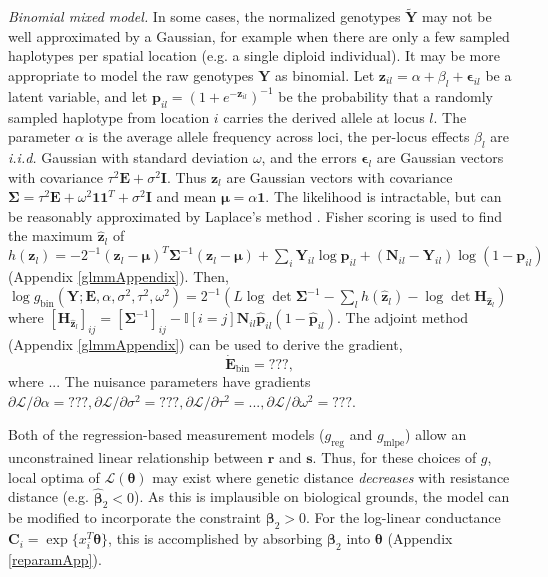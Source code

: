 \documentclass[11pt]{article}
\newcommand{\mat}[1]{\mathbf{#1}}
\begin{document}
\emph{Binomial mixed model.} In some cases, the normalized genotypes
$\tilde{\mat Y}$ may not be well approximated by a Gaussian, for example when
there are only a few sampled haplotypes per spatial location (e.g. a single
diploid individual). It may be more appropriate to model the raw genotypes
$\mat Y$ as binomial. Let $\mat z_{il} = \alpha + \beta_l + \bm \epsilon_{il}$ be a latent variable, and let $\mat p_{il} = (1 + e^{-\mat z_{il}})^{-1}$ 
be the probability that a randomly sampled haplotype from location $i$ carries the derived allele at locus $l$. The parameter
$\alpha$ is the average allele frequency across loci, the per-locus effects $\beta_l$ are \emph{i.i.d.} Gaussian with standard deviation $\omega$,
and the errors $\bm \epsilon_l$ are Gaussian vectors with covariance $\tau^2 \mat E + \sigma^2 \mat I$. 
Thus $\mat z_l$ are Gaussian vectors with covariance 
$\mat \Sigma = \tau^2 \mat E + \omega^2 \mat 1 \mat 1^T + \sigma^2 \mat I$ and mean $\bm \mu = \alpha \mat 1$.
The likelihood is intractable, but can be reasonably approximated by Laplace's
method \cite{laplaceApprox}. Fisher scoring is used to find the maximum $\hat{\mat z}_l$ of $h(\mat z_l) = -2^{-1} (\mat z_l - \bm \mu)^T
\mat \Sigma^{-1} (\mat z_l - \bm \mu) + \sum_i \mat Y_{il} \log \mat p_{il} + (\mat N_{il}
- \mat Y_{il}) \log (1 - \mat p_{il}) $ (Appendix
\ref{glmmAppendix}).
Then, 
$\log g_{\mathrm{bin}}(\mat Y; \mat E, \alpha, \sigma^2, \tau^2, \omega^2) = 2^{-1} (L \log \det \mat \Sigma^{-1} - \sum_l h(\hat{\mat z}_l) - \log \det \mat H_{\hat{\mat z}_l})$ where
$[\mat H_{\hat{\mat z}_l}]_{ij} = [\mat \Sigma^{-1}]_{ij} - \mathbb{I}[i = j] \mat N_{il} \hat{\mat p}_{il} (1 - \hat{\mat p}_{il})$.
The adjoint method (Appendix \ref{glmmAppendix}) can be used to derive the gradient, 
\[
  \dot{\mat E}_{\mathrm{bin}} = ???,
\]
where ...
The nuisance parameters have gradients $\partial \mathcal{L}/\partial \alpha = ???, \partial \mathcal{L}/\partial \sigma^2 = ???, \partial \mathcal{L}/\partial \tau^2 = ..., \partial \mathcal{L}/\partial \omega^2 = ???$.

Both of the regression-based measurement models ($g_{\mathrm{reg}}$ and
$g_{\mathrm{mlpe}}$) allow an unconstrained linear relationship between $\mat r$ and
$\mat s$. Thus, for these choices of $g$, local optima of $\mathcal{L}(\bm
\theta)$ may exist where genetic distance \emph{decreases} with resistance
distance (e.g. $\hat{\bm \beta}_2 < 0$).  As this is implausible on biological
grounds, the model can be modified to incorporate the constraint $\bm \beta_2 >
0$. For the log-linear conductance $\mat C_i = \exp\{ x_i^T \bm \theta \}$,
this is accomplished by absorbing $\bm \beta_2$ into $\bm \theta$ (Appendix
\ref{reparamApp}).
\end{document}
